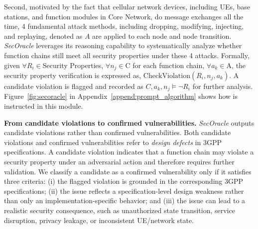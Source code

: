 Second, motivated by the fact that cellular network devices, including UEs, base stations, and function modules in Core Network, do message exchanges all the time, 
4 fundamental attack methods, including dropping, modifying, injecting, and replaying, denoted as $A$ are applied to each node and node transition. \textit{SecOracle} leverages its reasoning capability to systematically analyze whether function chains still meet all security properties under these 4 attacks. Formally, given $\forall R_i \in $Security Properties, $\forall n_j \in \text{C}$ for each function chain, $\forall a_k \in \text{A}$,  the security property verification is expressed as, 
\(
\text{CheckViolation}(R_i, n_j, a_k).
\)
A candidate violation is flagged and recorded as 
\(
C, a_k, n_j \models \neg R_i
\) 
for further analysis. 
Figure~\ref{fig:secoracle} in Appendix~\ref{append:prompt_algorithm} shows how \core is instructed in this module.

\noindent \textbf{From candidate violations to confirmed vulnerabilities.}  
\textit{SecOracle} outputs candidate violations rather than confirmed vulnerabilities. Both candidate violations and confirmed vulnerabilities refer to \textit{design defects} in 3GPP specifications. A candidate violation indicates that a function chain may violate a security property under an adversarial action and therefore requires further validation. We classify a candidate as a confirmed vulnerability only if it satisfies three criteria: (i) the flagged violation is grounded in the corresponding 3GPP specifications; (ii) the issue reflects a specification-level design weakness rather than only an implementation-specific behavior; and (iii) the issue can lead to a realistic security consequence, such as unauthorized state transition, service disruption, privacy leakage, or inconsistent UE/network state. 
 


